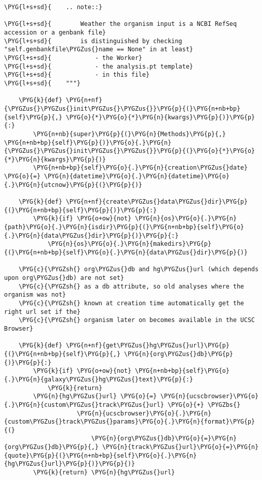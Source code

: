 \begin{Verbatim}[commandchars=\\\{\}]
\PYG{l+s+sd}{    .. note::}

\PYG{l+s+sd}{        Weather the organism input is a NCBI RefSeq accession or a genbank file}
\PYG{l+s+sd}{        is distinguished by checking "self.genbankfile\PYGZus{}name == None" in at least}
\PYG{l+s+sd}{            - the Worker}
\PYG{l+s+sd}{            - the analysis.pt template}
\PYG{l+s+sd}{            - in this file}
\PYG{l+s+sd}{    """}

    \PYG{k}{def} \PYG{n+nf}{\PYGZus{}\PYGZus{}init\PYGZus{}\PYGZus{}}\PYG{p}{(}\PYG{n+nb+bp}{self}\PYG{p}{,} \PYG{o}{*}\PYG{o}{*}\PYG{n}{kwargs}\PYG{p}{)}\PYG{p}{:}
        \PYG{n+nb}{super}\PYG{p}{(}\PYG{n}{Methods}\PYG{p}{,} \PYG{n+nb+bp}{self}\PYG{p}{)}\PYG{o}{.}\PYG{n}{\PYGZus{}\PYGZus{}init\PYGZus{}\PYGZus{}}\PYG{p}{(}\PYG{o}{*}\PYG{o}{*}\PYG{n}{kwargs}\PYG{p}{)}
        \PYG{n+nb+bp}{self}\PYG{o}{.}\PYG{n}{creation\PYGZus{}date} \PYG{o}{=} \PYG{n}{datetime}\PYG{o}{.}\PYG{n}{datetime}\PYG{o}{.}\PYG{n}{utcnow}\PYG{p}{(}\PYG{p}{)}

    \PYG{k}{def} \PYG{n+nf}{create\PYGZus{}data\PYGZus{}dir}\PYG{p}{(}\PYG{n+nb+bp}{self}\PYG{p}{)}\PYG{p}{:}
        \PYG{k}{if} \PYG{o+ow}{not} \PYG{n}{os}\PYG{o}{.}\PYG{n}{path}\PYG{o}{.}\PYG{n}{isdir}\PYG{p}{(}\PYG{n+nb+bp}{self}\PYG{o}{.}\PYG{n}{data\PYGZus{}dir}\PYG{p}{)}\PYG{p}{:}
            \PYG{n}{os}\PYG{o}{.}\PYG{n}{makedirs}\PYG{p}{(}\PYG{n+nb+bp}{self}\PYG{o}{.}\PYG{n}{data\PYGZus{}dir}\PYG{p}{)}

    \PYG{c}{\PYGZsh{} org\PYGZus{}db and hg\PYGZus{}url (which depends upon org\PYGZus{}db) are not set}
    \PYG{c}{\PYGZsh{} as a db attribute, so old analyses where the organism was not}
    \PYG{c}{\PYGZsh{} known at creation time automatically get the right url set if the}
    \PYG{c}{\PYGZsh{} organism later on becomes available in the UCSC Browser}

    \PYG{k}{def} \PYG{n+nf}{get\PYGZus{}hg\PYGZus{}url}\PYG{p}{(}\PYG{n+nb+bp}{self}\PYG{p}{,} \PYG{n}{org\PYGZus{}db}\PYG{p}{)}\PYG{p}{:}
        \PYG{k}{if} \PYG{o+ow}{not} \PYG{n+nb+bp}{self}\PYG{o}{.}\PYG{n}{galaxy\PYGZus{}hg\PYGZus{}text}\PYG{p}{:}
            \PYG{k}{return}
        \PYG{n}{hg\PYGZus{}url} \PYG{o}{=} \PYG{n}{ucscbrowser}\PYG{o}{.}\PYG{n}{custom\PYGZus{}track\PYGZus{}url} \PYG{o}{+} \PYGZbs{}
                    \PYG{n}{ucscbrowser}\PYG{o}{.}\PYG{n}{custom\PYGZus{}track\PYGZus{}params}\PYG{o}{.}\PYG{n}{format}\PYG{p}{(}
                        \PYG{n}{org\PYGZus{}db}\PYG{o}{=}\PYG{n}{org\PYGZus{}db}\PYG{p}{,} \PYG{n}{track\PYGZus{}url}\PYG{o}{=}\PYG{n}{quote}\PYG{p}{(}\PYG{n+nb+bp}{self}\PYG{o}{.}\PYG{n}{hg\PYGZus{}url}\PYG{p}{)}\PYG{p}{)}
        \PYG{k}{return} \PYG{n}{hg\PYGZus{}url}


\end{Verbatim}
